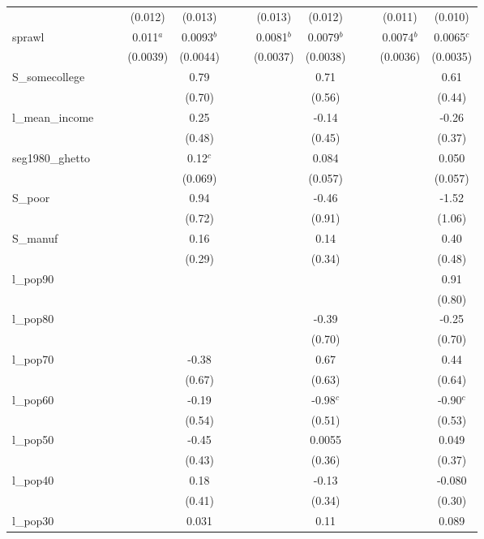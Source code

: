 \documentclass[]{article}
\begin{document}
\begin{tabular}{lcccccccccccc}
 &  &  & (0.012) & (0.013) &  &  & (0.013) & (0.012) &  &  & (0.011) & (0.010) \\
sprawl &  &  & 0.011$^a$ & 0.0093$^b$ &  &  & 0.0081$^b$ & 0.0079$^b$ &  &  & 0.0074$^b$ & 0.0065$^c$ \\
 &  &  & (0.0039) & (0.0044) &  &  & (0.0037) & (0.0038) &  &  & (0.0036) & (0.0035) \\
S\_somecollege &  &  &  & 0.79 &  &  &  & 0.71 &  &  &  & 0.61 \\
 &  &  &  & (0.70) &  &  &  & (0.56) &  &  &  & (0.44) \\
l\_mean\_income &  &  &  & 0.25 &  &  &  & -0.14 &  &  &  & -0.26 \\
 &  &  &  & (0.48) &  &  &  & (0.45) &  &  &  & (0.37) \\
seg1980\_ghetto &  &  &  & 0.12$^c$ &  &  &  & 0.084 &  &  &  & 0.050 \\
 &  &  &  & (0.069) &  &  &  & (0.057) &  &  &  & (0.057) \\
S\_poor &  &  &  & 0.94 &  &  &  & -0.46 &  &  &  & -1.52 \\
 &  &  &  & (0.72) &  &  &  & (0.91) &  &  &  & (1.06) \\
S\_manuf &  &  &  & 0.16 &  &  &  & 0.14 &  &  &  & 0.40 \\
 &  &  &  & (0.29) &  &  &  & (0.34) &  &  &  & (0.48) \\
l\_pop90 &  &  &  &  &  &  &  &  &  &  &  & 0.91 \\
 &  &  &  &  &  &  &  &  &  &  &  & (0.80) \\
l\_pop80 &  &  &  &  &  &  &  & -0.39 &  &  &  & -0.25 \\
 &  &  &  &  &  &  &  & (0.70) &  &  &  & (0.70) \\
l\_pop70 &  &  &  & -0.38 &  &  &  & 0.67 &  &  &  & 0.44 \\
 &  &  &  & (0.67) &  &  &  & (0.63) &  &  &  & (0.64) \\
l\_pop60 &  &  &  & -0.19 &  &  &  & -0.98$^c$ &  &  &  & -0.90$^c$ \\
 &  &  &  & (0.54) &  &  &  & (0.51) &  &  &  & (0.53) \\
l\_pop50 &  &  &  & -0.45 &  &  &  & 0.0055 &  &  &  & 0.049 \\
 &  &  &  & (0.43) &  &  &  & (0.36) &  &  &  & (0.37) \\
l\_pop40 &  &  &  & 0.18 &  &  &  & -0.13 &  &  &  & -0.080 \\
 &  &  &  & (0.41) &  &  &  & (0.34) &  &  &  & (0.30) \\
l\_pop30 &  &  &  & 0.031 &  &  &  & 0.11 &  &  &  & 0.089 \\

\end{tabular}
\end{document}
